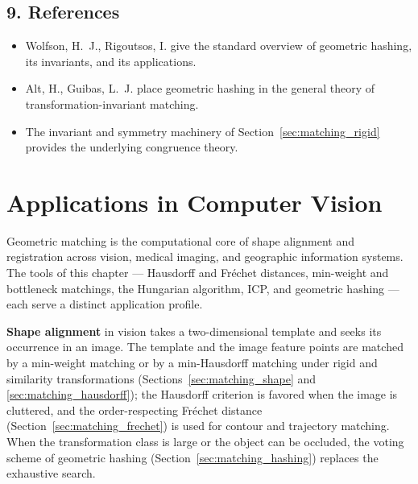 \subsection{9. References}

\begin{itemize}
\item Wolfson, H.~J., Rigoutsos, I. \cite{wolfson1997} give the standard
  overview of geometric hashing, its invariants, and its applications.
\item Alt, H., Guibas, L.~J. \cite{alt1999} place geometric hashing in the
  general theory of transformation-invariant matching.
\item The invariant and symmetry machinery of Section~\ref{sec:matching_rigid}
  provides the underlying congruence theory.
\end{itemize}


\section{Applications in Computer Vision}
\label{sec:matching_vision}

Geometric matching is the computational core of shape
alignment and registration across vision, medical imaging, and geographic
information systems. The tools of this chapter --- Hausdorff and Fr\'echet
distances, min-weight and bottleneck matchings, the Hungarian algorithm, ICP,
and geometric hashing --- each serve a distinct application profile.

\textbf{Shape alignment} in vision takes a
two-dimensional template and seeks its occurrence in an image. The template
and the image feature points are matched by a min-weight matching or by a
min-Hausdorff matching under rigid and similarity transformations
(Sections~\ref{sec:matching_shape} and \ref{sec:matching_hausdorff}); the
Hausdorff criterion is favored when the image is cluttered, and the
order-respecting Fr\'echet distance
(Section~\ref{sec:matching_frechet}) is used for contour and trajectory
matching. When the transformation class is large or the object can be
occluded, the voting scheme of geometric hashing
(Section~\ref{sec:matching_hashing}) replaces the exhaustive search.


